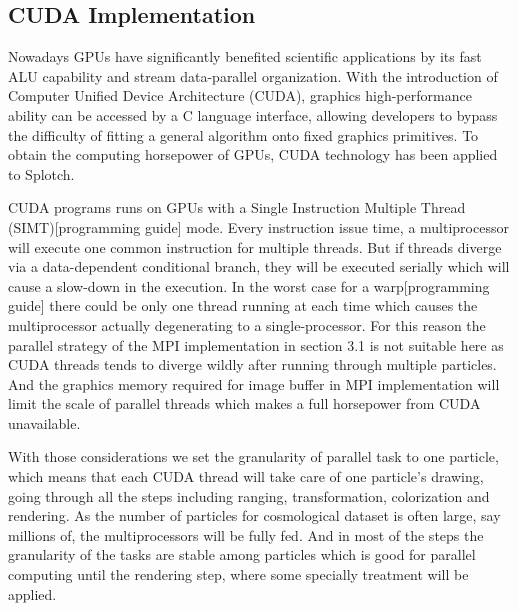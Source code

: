 \subsection{CUDA Implementation}
\label{cuda}
Nowadays GPUs have significantly benefited scientific applications by its fast ALU 
capability and stream data-parallel organization. With the introduction of
 Computer Unified Device Architecture (CUDA), graphics high-performance 
 ability can be accessed by a C language interface, allowing developers to bypass 
 the difficulty of fitting a general algorithm onto fixed graphics primitives. 
To obtain the computing horsepower of GPUs, CUDA technology has been applied
to Splotch.

CUDA programs runs on GPUs with a Single Instruction Multiple Thread (SIMT)[programming guide] 
mode. Every instruction issue time, a multiprocessor will execute one common instruction 
for multiple threads. But if threads diverge via a data-dependent 
conditional branch, they will be executed serially which will cause a 
slow-down in the execution. In the worst case for a warp[programming guide] there could 
be only one thread running at each time which causes the multiprocessor
 actually degenerating to a single-processor. For this reason the parallel strategy of 
 the MPI implementation in section 3.1 is not suitable here as CUDA threads tends to 
 diverge wildly after running through multiple particles. And the graphics memory 
required for image buffer in MPI implementation will limit the scale 
of parallel threads which makes a full horsepower from CUDA unavailable.

With those considerations we set the granularity of parallel task to one particle, which 
means that each CUDA thread will take care of one particle's drawing, 
going through all the steps including ranging, transformation, colorization and 
rendering. As the number of particles for cosmological dataset is often large, 
say millions of, the multiprocessors will be fully fed. And in most of the steps the 
granularity of the tasks are stable among particles which is good for
parallel computing until the rendering step, where some specially treatment will be applied.


